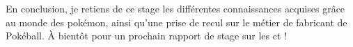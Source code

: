 \documentclass[../main.tex]{subfiles}
\begin{document}

En conclusion, je retiens de ce stage les différentes connaissances acquises grâce au monde des pokémon, ainsi qu'une prise de recul sur le métier de fabricant de Pokéball.
À bientôt pour un prochain rapport de stage sur les \acrshort{ct} !
\end{document}
